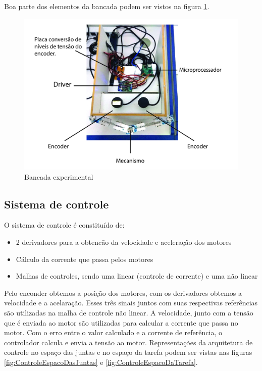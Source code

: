 \documentclass[]{politex}
\begin{document}
Boa parte dos elementos da bancada podem ser vistos na figura \ref{fig:BancadaClara1}.

\begin{figure}[H]
    \centering
    \includegraphics[scale=0.1]{imagens/BancadaClara1.jpg}
    \caption{Bancada experimental}
    \label{fig:BancadaClara1}
\end{figure}


\subsection{Sistema de controle}

O sistema de controle é constituído de: 
\begin{itemize}
\item 2 derivadores para a obtencão da velocidade e aceleração dos motores
\item Cálculo da corrente que passa pelos motores
\item Malhas de controles, sendo uma linear (controle de corrente) e uma não linear 
\end{itemize} 

Pelo enconder obtemos a posição dos motores, com os derivadores obtemos a velocidade e a acelaração. Esses três sinais juntos com suas respectivas referências são utilizadas na malha de controle não linear. A velocidade, junto com a tensão que é enviada ao motor são utilizadas para calcular a corrente que passa no motor. Com o erro entre o valor calculado e a corrente de referência, o controlador calcula e envia a tensão ao motor. Representações da arquitetura de controle no espaço das juntas e no espaço da tarefa podem ser vistas nas figuras \ref{fig:ControleEspacoDasJuntas} e \ref{fig:ControleEspacoDaTarefa}.
\end{document}

